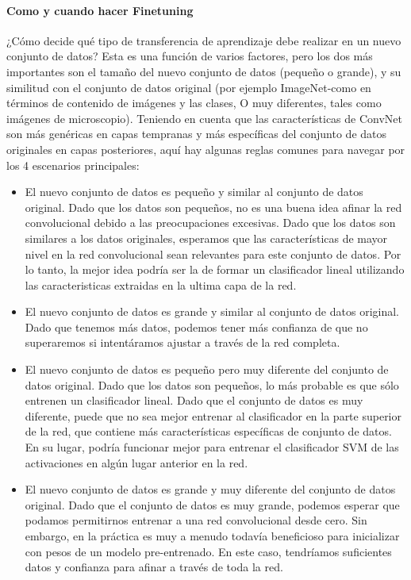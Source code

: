 \documentclass[a4paper,10pt]{article}
\begin{document}
      \paragraph{Como y cuando hacer Finetuning}
	¿Cómo decide qué tipo de transferencia de aprendizaje debe realizar en un nuevo conjunto de datos? Esta es una función de varios factores, pero los dos más importantes son el 
	tamaño del nuevo conjunto de datos (pequeño o grande), y su similitud con el conjunto de datos original (por ejemplo ImageNet-como en términos de contenido de imágenes y las clases,
	O muy diferentes, tales como imágenes de microscopio). Teniendo en cuenta que las características de ConvNet son más genéricas en capas tempranas y más específicas del conjunto de datos
	originales en capas posteriores, aquí hay algunas reglas comunes para navegar por los 4 escenarios principales:
	\begin{itemize}
	  \item El nuevo conjunto de datos es pequeño y similar al conjunto de datos original. Dado que los datos son pequeños, no es una buena idea afinar la red convolucional debido a las 
	  preocupaciones excesivas. Dado que los datos son similares a los datos originales, esperamos que las características de mayor nivel en la red convolucional sean relevantes para este
	  conjunto de datos. Por lo tanto, la mejor idea podría ser la de formar un clasificador lineal utilizando las caracteristicas extraidas en la ultima capa de la red.
	  \item El nuevo conjunto de datos es grande y similar al conjunto de datos original. Dado que tenemos más datos, podemos tener más confianza de que no superaremos si intentáramos 
	  ajustar a través de la red completa.
	  \item El nuevo conjunto de datos es pequeño pero muy diferente del conjunto de datos original. Dado que los datos son pequeños, lo más probable es que sólo entrenen un clasificador 
	  lineal. Dado que el conjunto de datos es muy diferente, puede que no sea mejor entrenar al clasificador en la parte superior de la red, que contiene más características específicas
	  de conjunto de datos. En su lugar, podría funcionar mejor para entrenar el clasificador SVM de las activaciones en algún lugar anterior en la red.
	  \item El nuevo conjunto de datos es grande y muy diferente del conjunto de datos original. Dado que el conjunto de datos es muy grande, podemos esperar que podamos permitirnos 
	  entrenar a una red convolucional desde cero. Sin embargo, en la práctica es muy a menudo todavía beneficioso para inicializar con pesos de un modelo pre-entrenado. 
	  En este caso, tendríamos suficientes datos y confianza para afinar a través de toda la red.
	\end{itemize}
\end{document}
